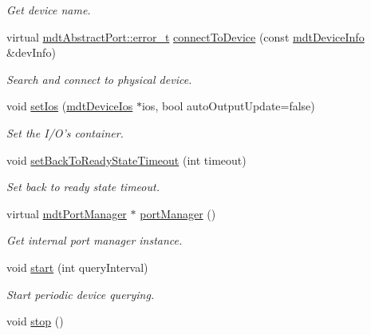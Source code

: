 \begin{DoxyCompactItemize}
\begin{DoxyCompactList}\small\item\em Get device name. \end{DoxyCompactList}\item 
virtual \hyperlink{classmdt_abstract_port_ad4121bb930c95887e77f8bafa065a85e}{mdtAbstractPort::error\_\-t} \hyperlink{classmdt_device_abab1b6e45af527880ce469ae318474c0}{connectToDevice} (const \hyperlink{classmdt_device_info}{mdtDeviceInfo} \&devInfo)
\begin{DoxyCompactList}\small\item\em Search and connect to physical device. \end{DoxyCompactList}\item 
void \hyperlink{classmdt_device_a9f1de62ef54974b0636dee673bd819e2}{setIos} (\hyperlink{classmdt_device_ios}{mdtDeviceIos} $\ast$ios, bool autoOutputUpdate=false)
\begin{DoxyCompactList}\small\item\em Set the I/O's container. \end{DoxyCompactList}\item 
void \hyperlink{classmdt_device_aa241c40514683254990e742cf1bbb155}{setBackToReadyStateTimeout} (int timeout)
\begin{DoxyCompactList}\small\item\em Set back to ready state timeout. \end{DoxyCompactList}\item 
virtual \hyperlink{classmdt_port_manager}{mdtPortManager} $\ast$ \hyperlink{classmdt_device_a06d9178b4133fd7b23084e712af20976}{portManager} ()
\begin{DoxyCompactList}\small\item\em Get internal port manager instance. \end{DoxyCompactList}\item 
void \hyperlink{classmdt_device_a721c5bf2cfa0eef5304333f08da182f7}{start} (int queryInterval)
\begin{DoxyCompactList}\small\item\em Start periodic device querying. \end{DoxyCompactList}\item 
\hypertarget{classmdt_device_adc7ff8f01d68506283a3d0cc6bc25407}{
void \hyperlink{classmdt_device_adc7ff8f01d68506283a3d0cc6bc25407}{stop} ()}
\label{classmdt_device_adc7ff8f01d68506283a3d0cc6bc25407}


\end{DoxyCompactItemize}
